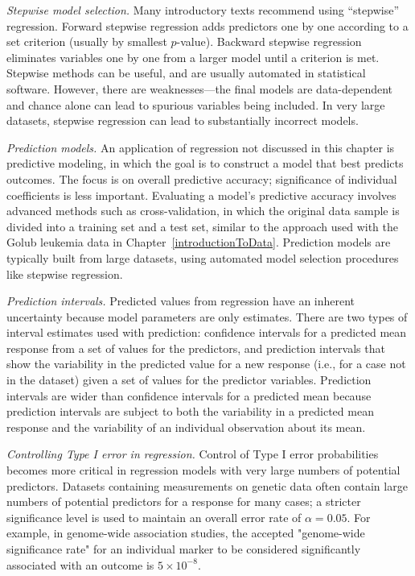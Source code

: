 \begin{description}
	\item \emph{Stepwise model selection.} Many introductory texts recommend using ``stepwise'' regression. Forward stepwise regression adds predictors one by one according to a set criterion (usually by smallest $p$-value). Backward stepwise regression eliminates variables one by one from a larger model until a criterion is met. Stepwise methods can be useful, and are usually automated in statistical software. However, there are weaknesses---the final models are data-dependent and chance alone can lead to spurious variables being included. In very large datasets, stepwise regression can lead to substantially incorrect models.
	
	\item \emph{Prediction models.} An application of regression not discussed in this chapter is predictive modeling, in which the goal is to construct a model that best predicts outcomes. The focus is on overall predictive accuracy; significance of individual coefficients is less important. Evaluating a model's predictive accuracy involves advanced methods such as cross-validation, in which the original data sample is divided into a training set and a test set, similar to the approach used with the Golub leukemia data in Chapter~\ref{introductionToData}. Prediction models are typically built from large datasets, using automated model selection procedures like stepwise regression.
	
	\item \emph{Prediction intervals.} Predicted values from regression have an inherent uncertainty because model parameters are only estimates. There are two types of interval estimates used with prediction: confidence intervals for a predicted mean response from a set of values for the predictors, and prediction intervals that show the variability in the predicted value for a new response (i.e., for a case not in the dataset) given a set of values for the predictor variables. Prediction intervals are wider than confidence intervals for a predicted mean because prediction intervals are subject to both the variability in a predicted mean response and the variability of an individual observation about its mean.
	
	\item \emph{Controlling Type I error in regression.} Control of Type I error probabilities becomes more critical in regression models with very large numbers of potential predictors. Datasets containing measurements on genetic data often contain large numbers of potential predictors for a response for many cases; a stricter significance level is used to maintain an overall error rate of $\alpha = 0.05$. For example, in genome-wide association studies, the accepted "genome-wide significance rate" for an individual marker to be considered significantly associated with an outcome is $5 \times 10^{-8}$.
	
\end{description}

